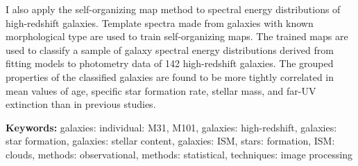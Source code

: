 \documentclass[12pt,twoside]{report}
\numberwithin{figure}{chapter}
\newenvironment{preliminary}%
{\pagestyle{plain}\pagenumbering{roman}}%
{\pagenumbering{arabic}}
\begin{document}
\begin{preliminary}
I also apply the self-organizing map method to spectral energy distributions of high-redshift galaxies.
Template spectra made from galaxies with known morphological type are used to train self-organizing maps.
The trained maps are used to classify a sample of galaxy spectral energy distributions derived from fitting models to photometry data of 142 high-redshift galaxies.
The grouped properties of the classified galaxies are found to be more tightly correlated in mean values of age, specific star formation rate, stellar mass, and far-UV extinction than in previous studies.



\vfill
\textbf{Keywords:} galaxies: individual: M31, M101, galaxies: high-redshift, galaxies: star formation, galaxies: stellar content, galaxies: ISM, stars: formation, ISM: clouds, methods: observational, methods: statistical, techniques: image processing
\newpage
\tableofcontents\newpage
\newpage
{}
\listoffigures
\newpage
{}
\listoftables\newpage
\end{preliminary}







\end{document}
